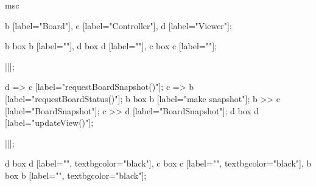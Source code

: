 \begin{msc}
msc {

b [label="Board"],
c [label="Controller"],
d [label="Viewer"];

b box b [label=""],
d box d [label=""],
c box c [label=""];

|||;

d => c [label="requestBoardSnapshot()"];
c => b [label="requestBoardStatus()"];
b box b [label="make snapshot"];
b >> c [label="BoardSnapshot"];
c >> d [label="BoardSnapshot"];
d box d [label="updateView()"];

|||;

d box d [label="", textbgcolor="black"],
c box c [label="", textbgcolor="black"],
b box b [label="", textbgcolor="black"];

}
\end{msc}
